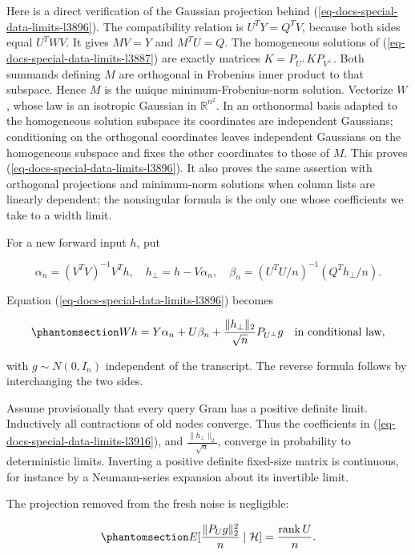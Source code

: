 \documentclass[
  11pt,
]{article}
\theoremstyle{definition}
\theoremstyle{plain}
\theoremstyle{plain}
\theoremstyle{plain}
\theoremstyle{remark}
\begin{document}
Here is a direct verification of the Gaussian projection behind
(\ref{eq-docs-special-data-limits-l3896}). The compatibility relation is
\(U^TY=Q^TV\), because both sides equal \(U^TWV\). It gives \(MV=Y\) and
\(M^TU=Q\). The homogeneous solutions of
(\ref{eq-docs-special-data-limits-l3887}) are exactly matrices
\(K=P_{U^\perp}KP_{V^\perp}\). Both summands defining \(M\) are
orthogonal in Frobenius inner product to that subspace. Hence \(M\) is
the unique minimum-Frobenius-norm solution. Vectorize \(W\), whose law
is an isotropic Gaussian in \(\mathbb R^{n^2}\). In an orthonormal basis
adapted to the homogeneous solution subspace its coordinates are
independent Gaussians; conditioning on the orthogonal coordinates leaves
independent Gaussians on the homogeneous subspace and fixes the other
coordinates to those of \(M\). This proves
(\ref{eq-docs-special-data-limits-l3896}). It also proves the same
assertion with orthogonal projections and minimum-norm solutions when
column lists are linearly dependent; the nonsingular formula is the only
one whose coefficients we take to a width limit.

For a new forward input \(h\), put

\[
\alpha_n=(V^TV)^{-1}V^Th,
\quad h_\perp=h-V\alpha_n,
\quad
\beta_n=(U^TU/n)^{-1}(Q^Th_\perp/n).
\]

Equation (\ref{eq-docs-special-data-limits-l3896}) becomes

\begin{equation}\protect\phantomsection\label{eq-docs-special-data-limits-l3916}{
Wh=Y\alpha_n+U\beta_n
 +\frac{\|h_\perp\|_2}{\sqrt n}P_{U^\perp}g
\quad\hbox{in conditional law},
}\end{equation}

with \(g\sim N(0,I_n)\) independent of the transcript. The reverse
formula follows by interchanging the two sides.

Assume provisionally that every query Gram has a positive definite
limit. Inductively all contractions of old nodes converge. Thus the
coefficients in (\ref{eq-docs-special-data-limits-l3916}), and
\(\frac{\|h_\perp\|_2}{\sqrt n}\), converge in probability to
deterministic limits. Inverting a positive definite fixed-size matrix is
continuous, for instance by a Neumann-series expansion about its
invertible limit.

The projection removed from the fresh noise is negligible:

\begin{equation}\protect\phantomsection\label{eq-docs-special-data-limits-l3927}{
E[\frac{\|P_Ug\|_2^2}{n}\mid\mathcal H]
=\frac{\operatorname{rank}U}{n}.
}\end{equation}
\end{document}
